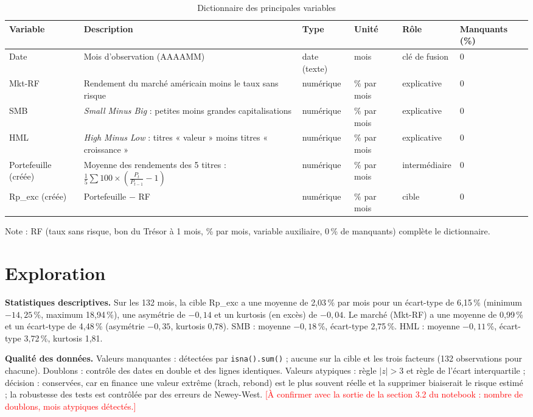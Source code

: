 \documentclass[11pt,a4paper]{article}
\newcommand{\pc}{\,\%}
\newcommand{\mkt}{Mkt-RF}
\newcommand{\rouge}[1]{\textcolor{red}{#1}}
\begin{document}
\begin{table}[H]
\centering
\caption{Dictionnaire des principales variables}
\small
\begin{tabularx}{\textwidth}{|p{2.2cm}|X|p{1.6cm}|p{1.6cm}|p{2cm}|p{1.5cm}|}
\hline
\textbf{Variable} & \textbf{Description} & \textbf{Type} & \textbf{Unité} & \textbf{Rôle} & \textbf{Manquants (\%)}\\\hline
Date & Mois d'observation (AAAAMM) & date (texte) & mois & clé de fusion & 0\\\hline
Mkt-RF & Rendement du marché américain moins le taux sans risque & numérique & \% par mois & explicative & 0\\\hline
SMB & \textit{Small Minus Big} : petites moins grandes capitalisations & numérique & \% par mois & explicative & 0\\\hline
HML & \textit{High Minus Low} : titres « valeur » moins titres « croissance » & numérique & \% par mois & explicative & 0\\\hline
Portefeuille (créée) & Moyenne des rendements des 5 titres : $\frac{1}{5}\sum 100\times\left(\frac{P_t}{P_{t-1}}-1\right)$ & numérique & \% par mois & intermédiaire & 0\\\hline
Rp\_exc (créée) & Portefeuille $-$ RF & numérique & \% par mois & cible & 0\\\hline
\end{tabularx}
\end{table}

Note : RF (taux sans risque, bon du Trésor à 1 mois, \% par mois, variable auxiliaire, 0\,\% de manquants) complète le dictionnaire.

\section{Exploration}

\textbf{Statistiques descriptives.} Sur les 132 mois, la cible Rp\_exc a une moyenne de 2,03\pc{} par mois pour un écart-type de 6,15\pc{} (minimum $-14{,}25$\pc, maximum 18,94\pc), une asymétrie de $-0{,}14$ et un kurtosis (en excès) de $-0{,}04$. Le marché (\mkt) a une moyenne de 0,99\pc{} et un écart-type de 4,48\pc{} (asymétrie $-0{,}35$, kurtosis 0,78). SMB : moyenne $-0{,}18$\pc, écart-type 2,75\pc. HML : moyenne $-0{,}11$\pc, écart-type 3,72\pc, kurtosis 1,81.

\textbf{Qualité des données.} Valeurs manquantes : détectées par \texttt{isna().sum()} ; aucune sur la cible et les trois facteurs (132 observations pour chacune). Doublons : contrôle des dates en double et des lignes identiques. Valeurs atypiques : règle $|z|>3$ et règle de l'écart interquartile ; décision : conservées, car en finance une valeur extrême (krach, rebond) est le plus souvent réelle et la supprimer biaiserait le risque estimé ; la robustesse des tests est contrôlée par des erreurs de Newey-West. \rouge{[À confirmer avec la sortie de la section 3.2 du notebook : nombre de doublons, mois atypiques détectés.]}
\end{document}
